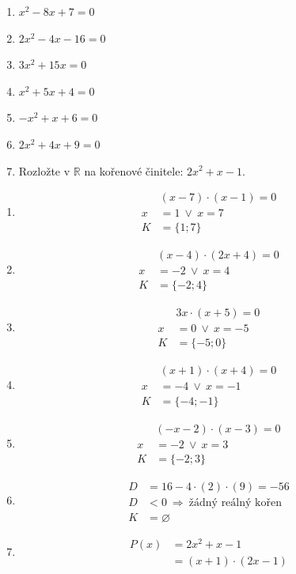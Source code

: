 \documentclass[11pt,a4paper]{article}
\begin{document}
\begin{zadaniReseniBox}[title={Domácí úkol}]
\begin{enumerate}[label=\alph*),itemsep=2pt]
\item $x^{2} - 8x + 7=0$
\item $2x^{2} - 4x - 16=0$
\item $3x^{2} + 15x=0$
\item $x^{2} + 5x + 4=0$
\item $- x^{2} + x + 6=0$
\item $2x^{2} + 4x + 9=0$
\item Rozložte v $\mathbb R$ na kořenové činitele: $2x^{2} + x - 1$.
\end{enumerate}
\tcblower
\begin{enumerate}[label=\alph*),itemsep=2pt]
\item
\[\begin{aligned}
&\left(x - 7\right) \cdot \left(x - 1\right)=0\\[2pt]
x&=1\ \vee\ x=7\\[2pt]
K&=\{1;7\}
\end{aligned}\]
\item
\[\begin{aligned}
&\left(x - 4\right) \cdot \left(2x + 4\right)=0\\[2pt]
x&=-2\ \vee\ x=4\\[2pt]
K&=\{-2;4\}
\end{aligned}\]
\item
\[\begin{aligned}
&3x \cdot \left(x + 5\right)=0\\[2pt]
x&=0\ \vee\ x=-5\\[2pt]
K&=\{-5;0\}
\end{aligned}\]
\item
\[\begin{aligned}
&\left(x + 1\right) \cdot \left(x + 4\right)=0\\[2pt]
x&=-4\ \vee\ x=-1\\[2pt]
K&=\{-4;-1\}
\end{aligned}\]
\item
\[\begin{aligned}
&\left(- x - 2\right) \cdot \left(x - 3\right)=0\\[2pt]
x&=-2\ \vee\ x=3\\[2pt]
K&=\{-2;3\}
\end{aligned}\]
\item
\[\begin{aligned}
D&=16-4\cdot(2)\cdot(9)=-56\\[2pt]
D&<0\ \Rightarrow\ \text{žádný reálný kořen}\\[2pt]
K&=\varnothing
\end{aligned}\]
\item \[ \begin{aligned}P(x)&=2x^{2} + x - 1\\ &= \left(x + 1\right) \cdot \left(2x - 1\right)\end{aligned}\]
\end{enumerate}
\end{zadaniReseniBox}
\end{document}
